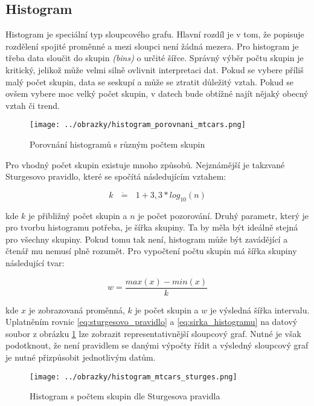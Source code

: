 \subsection{Histogram}

Histogram je speciální typ sloupcového grafu. Hlavní rozdíl je v tom, že popisuje rozdělení spojité proměnné a mezi sloupci není žádná mezera.
Pro histogram je třeba data sloučit do skupin \textit{(bins)} o určité šířce. Správný výběr počtu skupin je kritický, jelikož může velmi
silně ovlivnit interpretaci dat. Pokud se vybere příliš malý počet skupin, data se seskupí a může se ztratit důležitý vztah. Pokud se ovšem
vybere moc velký počet skupin, v datech bude obtížné najít nějaký obecný vztah či trend.

\begin{figure}[H]
    \centering
    \texttt{[image: ../obrazky/histogram\_porovnani\_mtcars.png]}
    \caption{Porovnání histogramů s různým počtem skupin} 
    \label{fig:histogram_porovnani_mtcars}
\end{figure}

Pro vhodný počet skupin existuje mnoho způsobů. Nejznámější je takzvané Sturgesovo pravidlo, které se spočítá následujícím vztahem:

\begin{equation}
    \label{eq:sturgesovo_pravidlo}
    k \text{ } \dot{\mathbf{=}} \text{ } 1 + 3,3 * log_{10}(n)
\end{equation}

kde $k$ je přibližný počet skupin a $n$ je počet pozorování. Druhý parametr, který je pro tvorbu histogramu potřeba, je šířka skupiny.
Ta by měla být ideálně stejná pro všechny skupiny. Pokud tomu tak není, histogram může být zavádějící a čtenář mu nemusí plně rozumět.
Pro vypočtení počtu skupin má šířka skupiny následující tvar:

\begin{equation}
    \label{eq:sirka_histogramu}
    w = \frac{max(x) - min(x)}{k}
\end{equation}

kde $x$ je zobrazovaná proměnná, $k$ je počet skupin a $w$ je výsledná šířka intervalu. 
Uplatněním rovnic \ref{eq:sturgesovo_pravidlo} a \ref{eq:sirka_histogramu} na datový soubor z obrázku \ref{fig:histogram_porovnani_mtcars}
lze zobrazit representativnější sloupcový graf. Nutné je však podotknout, že není pravidlem se danými výpočty řídit a výsledný
sloupcový graf je nutné přizpůsobit jednotlivým datům.
\begin{figure}[H]
    \centering
    \texttt{[image: ../obrazky/histogram\_mtcars\_sturges.png]}
    \caption{Histogram s počtem skupin dle Sturgesova pravidla} 
    \label{fig:histogram_mtcars_sturges}
\end{figure}

